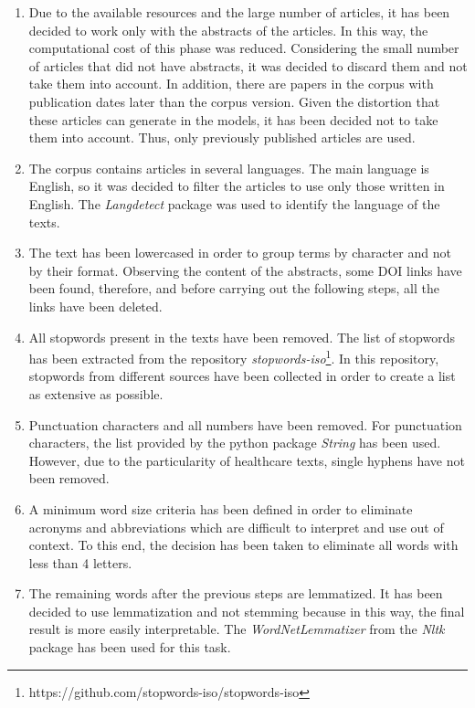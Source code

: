\documentclass[a4paper,10pt]{article}
\begin{document}
\begin{enumerate}
    \item Due to the available resources and the large number of articles, it has been decided to work only with the abstracts of the articles. In this way, the computational cost of this phase was reduced. Considering the small number of articles that did not have abstracts, it was decided to discard them and not take them into account. In addition, there are papers in the corpus with publication dates later than the corpus version. Given the distortion that these articles can generate in the models, it has been decided not to take them into account. Thus, only previously published articles are used.

    \item The corpus contains articles in several languages. The main language is English, so it was decided to filter the articles to use only those written in English. The \textit{Langdetect} package was used to identify the language of the texts.

    \item The text has been lowercased in order to group terms by character and not by their format. Observing the content of the abstracts, some DOI links have been found, therefore, and before carrying out the following steps, all the links have been deleted.

    \item All stopwords present in the texts have been removed. The list of stopwords has been extracted from the repository \textit{stopwords-iso}\footnote{https://github.com/stopwords-iso/stopwords-iso}. In this repository, stopwords from different sources have been collected in order to create a list as extensive as possible.

    \item Punctuation characters and all numbers have been removed. For punctuation characters, the list provided by the python package \textit{String} has been used. However, due to the particularity of healthcare texts, single hyphens have not been removed.

    \item A minimum word size criteria has been defined in order to eliminate acronyms and abbreviations which are difficult to interpret and use out of context. To this end, the decision has been taken to eliminate all words with less than 4 letters.

    \item The remaining words after the previous steps are lemmatized. It has been decided to use lemmatization and not stemming because in this way, the final result is more easily interpretable. The \textit{WordNetLemmatizer} from the \textit{Nltk} package has been used for this task.


\end{enumerate}
\end{document}
